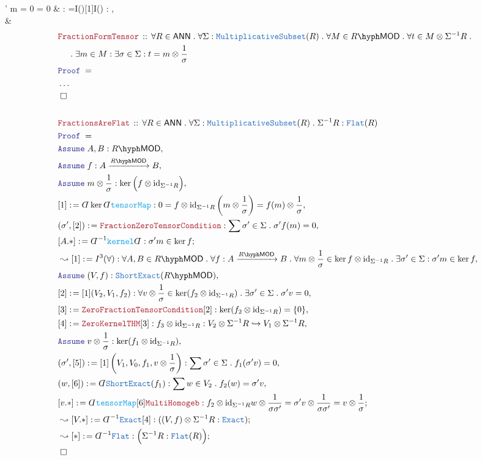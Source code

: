 \documentclass[12pt]{scrartcl}%
\newcommand{\TYPE}[1]{\textcolor{NavyBlue}{\mathtt{#1}}}%
\newcommand{\FUNC}[1]{\textcolor{Cerulean}{\mathtt{#1}}}%
\newcommand{\LOGIC}[1]{\textcolor{Blue}{\mathtt{#1}}}%
\newcommand{\THM}[1]{\textcolor{Maroon}{\mathtt{#1}}}%
\renewcommand{\.}{\; . \;} %
\newcommand{\de}{: \kern 0.1pc =} %
\newcommand{\Theorem}[2]{& \THM{#1} \, :: \, #2 \\ & \Proof = \\ } %
\newcommand{\NewLine}{\\ & \kern 1pc}%
\newcommand{\Page}[1]{ \begin{align*} #1 \end{align*}  }%
\newcommand{ \bd }{ \ByDef }%
\newcommand{\NoProof}{ & \ldots \\ \EndProof}%
\DeclareMathOperator*{\id}{id}%
\newcommand{\ToInj}{\hookrightarrow} %
\newcommand{\Say}[3]{& #1 \de #2 : #3, \\} %
\newcommand{\Conclude}[3]{& #1 \de #2 : #3; \\}%
\newcommand{\Derive}[3]{& \leadsto #1 \de #2 : #3, \\} %
\newcommand{\DeriveConclude}[3]{& \leadsto #1 \de #2 : #3 ; \\} %
\newcommand{\Assume}[2]{& \LOGIC{Assume} \; #1 : #2, \\} %
\newcommand{\QED}{\; \square} %
\newcommand{\EndProof}{& \QED \\} %
\newcommand{\ByDef}{\rotatebox[origin=c]{-180}{$D$}}%
\newcommand{\Proof}{\LOGIC{Proof} \; } %
\newcommand{\Arrow}[1]{\xrightarrow{#1}}%
\newcommand{\LMOD}[1]{#1\hyph\mathsf{MOD}} %
\newcommand{\MS}{\TYPE{MultiplicativeSubset}}
\newcommand{\ANN}{\mathsf{ANN}} %
\begin{document}
{{		\sigma' m \otimes {} = 
		0 \otimes {} = 
		0
	}
	\Derive{[*]}{I(\iff)[1]I(\Rightarrow)}{\LOGIC{This}}
	\EndProof
}\Page{
	\Theorem{FractionFormTensor}{ 
		\forall R \in \ANN \. 
		\forall \Sigma : \MS(R) \. 
		\forall M \in \LMOD{R} \.  
		\forall t \in M \otimes \Sigma^{-1}R \. \NewLine \.
		\exists m \in M : \exists \sigma \in \Sigma :
		t = m \otimes \frac{1}{\sigma}
	}
	\NoProof
	\\
	\Theorem{FractionsAreFlat}{\forall R \in \ANN \. \forall \Sigma : \MS(R) \. \Sigma^{-1} R : \TYPE{Flat}(R)}
	\Assume{A,B}{\LMOD{R}}
	\Assume{f}{A \Arrow{\LMOD{R}} B}
	\Assume{m \otimes \frac{1}{\sigma}}{\ker \Big(f \otimes {\id}_{\Sigma^{-1}R}\Big)}
	\Say{[1]}{\bd \ker \bd \FUNC{tensorMap}}{   0 =  f \otimes {\id}_{\Sigma^{-1}R} \left(m \otimes \frac{1}{\sigma} \right) = f(m) \otimes \frac{1}{\sigma}}
	\Say{(\sigma',[2])}{\THM{FractionZeroTensorCondition}}{\sum \sigma' \in \Sigma \. \sigma' f(m) = 0}
	\Conclude{[A.*]}{\bd^{-1} \FUNC{kernel} \bd }{\sigma' m \in \ker f}
	\Derive{[1]}{I^{3}(\forall)}
	{
		\forall A,B \in \LMOD{R} \. \forall f : A \Arrow{\LMOD{R}} B \. \forall m \otimes \frac{1}{\sigma} \in \ker f \otimes {\id}_{\Sigma^{-1}R} \. 
		\exists \sigma' \in \Sigma : \sigma' m \in \ker f
	}
	\Assume{(V,f)}{\TYPE{ShortExact}(\LMOD{R})}
	\Say{[2]}{[1](V_2,V_1,f_2)}{\forall v \otimes \frac{1}{\sigma}  \in \ker(f_2 \otimes {\id}_{\Sigma^{-1}R}) \. \exists \sigma' \in \Sigma \. \sigma'v = 0 }
	\Say{[3]}{\THM{ZeroFractionTensorCondition}[2]}{\ker(f_2 \otimes {\id}_{\Sigma^{-1}R})= \{0\}}
	\Say{[4]}{\THM{ZeroKernelTHM}[3]}{f_3 \otimes {\id}_{\Sigma^{-1}R} : V_2 \otimes \Sigma^{-1}R \ToInj V_1 \otimes \Sigma^{-1}R }
	\Assume{v \otimes \frac{1}{\sigma}}{\ker (f_1 \otimes {\id}_{\Sigma^{-1}R})} 
	\Say{(\sigma',[5])}{ [1]\left(V_1,V_0,f_1,v \otimes \frac{1}{\sigma} \right)}{ \sum \sigma' \in \Sigma \.  f_1(\sigma' v) = 0   }
	\Say{(w,[6])}{\bd \TYPE{ShortExact}(f_1)}{ \sum w \in V_2 \. f_2(w) = \sigma' v   }
	\Conclude{[v.*]}{ \bd \FUNC{tensorMap} [6] \THM{MultiHomogeb} }
	{ 
		f_2 \otimes  {\id}_{\Sigma^{-1}R}  w \otimes \frac{1}{\sigma \sigma'} = 
		\sigma' v \otimes \frac{1}{\sigma \sigma'} = 
		v \otimes \frac{1}{\sigma} 
	}
	\DeriveConclude{[V.*]}{\bd^{-1} \TYPE{Exact}[4]}{((V,f) \otimes \Sigma^{-1} R : \TYPE{Exact})}
	\DeriveConclude{[*]}{\bd^{-1}\TYPE{Flat}}{\Big(\Sigma^{-1}R : \TYPE{Flat}(R)\Big)}
	\EndProof
}
\newpage
\end{document}

